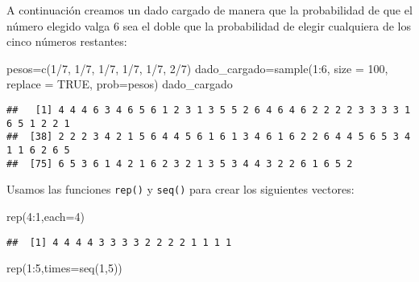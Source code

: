 \documentclass[
]{article}
\newenvironment{Shaded}{\begin{snugshade}}{\end{snugshade}}
\newcommand{\AttributeTok}[1]{\textcolor[rgb]{0.77,0.63,0.00}{#1}}
\newcommand{\ConstantTok}[1]{\textcolor[rgb]{0.00,0.00,0.00}{#1}}
\newcommand{\DecValTok}[1]{\textcolor[rgb]{0.00,0.00,0.81}{#1}}
\newcommand{\FunctionTok}[1]{\textcolor[rgb]{0.00,0.00,0.00}{#1}}
\newcommand{\NormalTok}[1]{#1}
\newcommand{\OtherTok}[1]{\textcolor[rgb]{0.56,0.35,0.01}{#1}}
\newcommand{\SpecialCharTok}[1]{\textcolor[rgb]{0.00,0.00,0.00}{#1}}
\begin{document}
A continuación creamos un dado cargado de manera que la probabilidad de
que el número elegido valga 6 sea el doble que la probabilidad de elegir
cualquiera de los cinco números restantes:

\begin{Shaded}
\begin{Highlighting}[]
\NormalTok{pesos}\OtherTok{=}\FunctionTok{c}\NormalTok{(}\DecValTok{1}\SpecialCharTok{/}\DecValTok{7}\NormalTok{, }\DecValTok{1}\SpecialCharTok{/}\DecValTok{7}\NormalTok{, }\DecValTok{1}\SpecialCharTok{/}\DecValTok{7}\NormalTok{, }\DecValTok{1}\SpecialCharTok{/}\DecValTok{7}\NormalTok{, }\DecValTok{1}\SpecialCharTok{/}\DecValTok{7}\NormalTok{, }\DecValTok{2}\SpecialCharTok{/}\DecValTok{7}\NormalTok{)}
\NormalTok{dado\_cargado}\OtherTok{=}\FunctionTok{sample}\NormalTok{(}\DecValTok{1}\SpecialCharTok{:}\DecValTok{6}\NormalTok{, }\AttributeTok{size =} \DecValTok{100}\NormalTok{, }\AttributeTok{replace =} \ConstantTok{TRUE}\NormalTok{, }\AttributeTok{prob=}\NormalTok{pesos)}
\NormalTok{dado\_cargado}
\end{Highlighting}
\end{Shaded}

\begin{verbatim}
##   [1] 4 4 4 6 3 4 6 5 6 1 2 3 1 3 5 5 2 6 4 6 4 6 2 2 2 2 3 3 3 3 1 6 5 1 2 2 1
##  [38] 2 2 2 3 4 2 1 5 6 4 4 5 6 1 6 1 3 4 6 1 6 2 2 6 4 4 5 6 5 3 4 1 1 6 2 6 5
##  [75] 6 5 3 6 1 4 2 1 6 2 3 2 1 3 5 3 4 4 3 2 2 6 1 6 5 2
\end{verbatim}

Usamos las funciones \texttt{rep()} y \texttt{seq()} para crear los
siguientes vectores:

\begin{Shaded}
\begin{Highlighting}[]
\FunctionTok{rep}\NormalTok{(}\DecValTok{4}\SpecialCharTok{:}\DecValTok{1}\NormalTok{,}\AttributeTok{each=}\DecValTok{4}\NormalTok{)}
\end{Highlighting}
\end{Shaded}

\begin{verbatim}
##  [1] 4 4 4 4 3 3 3 3 2 2 2 2 1 1 1 1
\end{verbatim}

\begin{Shaded}
\begin{Highlighting}[]
\FunctionTok{rep}\NormalTok{(}\DecValTok{1}\SpecialCharTok{:}\DecValTok{5}\NormalTok{,}\AttributeTok{times=}\FunctionTok{seq}\NormalTok{(}\DecValTok{1}\NormalTok{,}\DecValTok{5}\NormalTok{))}
\end{Highlighting}
\end{Shaded}
\end{document}
